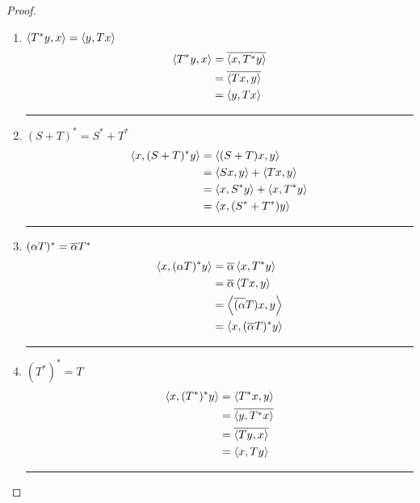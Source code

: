 \begin{proof}
	\begin{enumerate}
	\item $\left\langle T^\ast y,x \right\rangle = \left\langle y,Tx \right\rangle$
		\begin{align*}
			\left\langle T^\ast y,x \right\rangle & = \overline{\left\langle x,T^\ast y \right\rangle} \\
			& = \overline{\left\langle Tx,y \right\rangle} \\
			& = \left\langle y,Tx \right\rangle
		\end{align*}

	\hrule \vspace{1em}

	\item $(S+T)^\ast = S^\ast + T^\ast$
		\begin{align*}
			\left\langle x,(S+T)^\ast y \right\rangle
			& = \left\langle (S+T)x,y \right\rangle \\
			& = \left\langle Sx,y \right\rangle + \left\langle Tx,y \right\rangle \\
			& = \left\langle x,S^\ast y \right\rangle + \left\langle x,T^\ast y \right\rangle \\
			& = \left\langle x,(S^\ast+T^\ast)y \right\rangle\\
		\end{align*}

	\hrule \vspace{1em}

	\item $(\alpha T)^\ast = \overline{\alpha} T^\ast$
		\begin{align*}
			\left\langle x,(\alpha T)^\ast y \right\rangle
			& = \overline{\alpha} \left\langle x,T^\ast y \right\rangle \\
			& = \overline{\alpha} \left\langle Tx,y \right\rangle \\
			& = \left\langle \overline{(\alpha}T)x,y \right\rangle \\
			& = \left\langle x,(\overline{\alpha}T)^\ast y \right\rangle
		\end{align*}

	\hrule \vspace{1em}

	\item $(T^\ast)^\ast = T$
		\begin{align*}
			\left\langle x,(T^\ast)^\ast y \right\rangle
			& = \left\langle T^\ast x,y \right\rangle\\
			& = \overline{\left\langle y,T^\ast x \right\rangle} \\
			& = \overline{\left\langle Ty,x \right\rangle} \\
			& = \left\langle x,Ty \right\rangle
		\end{align*}

	\hrule \vspace{1em}


\end{enumerate}
\end{proof}
